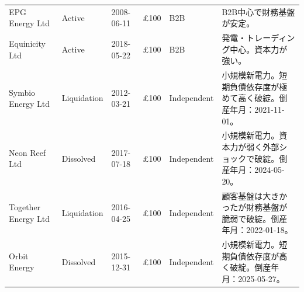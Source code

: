 \begin{landscape}
\begin{table}[H]
\begin{tabular}{p{3.2cm}p{1.4cm}p{1.8cm}p{1.8cm}p{2.2cm}p{10cm}}
EPG Energy Ltd & Active & 2008-06-11 & £100 & B2B &
B2B中心で財務基盤が安定。 \\

Equinicity Ltd & Active & 2018-05-22 & £100 & B2B &
発電・トレーディング中心。資本力が強い。 \\

Symbio Energy Ltd & Liquidation & 2012-03-21 & £100 & Independent &
小規模新電力。短期負債依存度が極めて高く破綻。倒産年月：2021-11-01。 \\

Neon Reef Ltd & Dissolved & 2017-07-18 & £100 & Independent &
小規模新電力。資本力が弱く外部ショックで破綻。倒産年月：2024-05-20。 \\

Together Energy Ltd & Liquidation & 2016-04-25 & £100 & Independent &
顧客基盤は大きかったが財務基盤が脆弱で破綻。倒産年月：2022-01-18。 \\

Orbit Energy & Dissolved & 2015-12-31 & £100 & Independent &
小規模新電力。短期負債依存度が高く破綻。倒産年月：2025-05-27。 \\

\bottomrule
\end{tabular}
\end{table}

\end{landscape}


